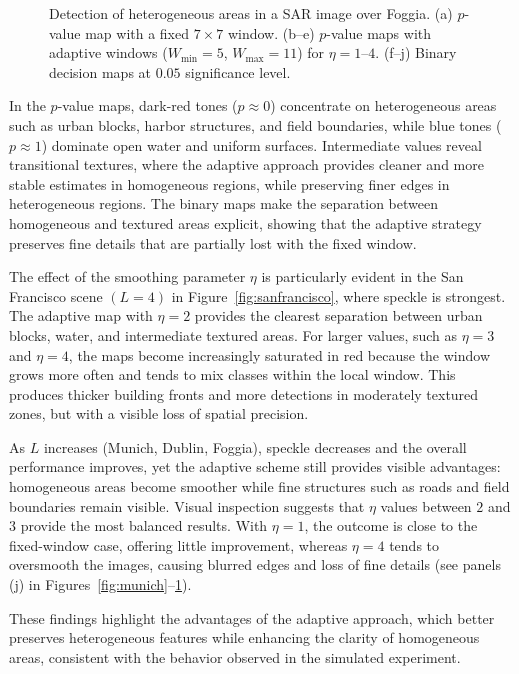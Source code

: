 \documentclass[
  lettersize  journal,
]{IEEEtran}%
\begin{document}
\begin{figure}[!t]
\caption{Detection of heterogeneous areas in a SAR image over Foggia. (a) $p$-value map with a fixed $7\times7$ window. (b–e) $p$-value maps with adaptive windows ($W_{\min}=5$, $W_{\max}=11$) for $\eta=1$--$4$. (f–j) Binary decision maps at $0.05$ significance level.}
\label{fig:foggia}
\end{figure}

In the \(p\)-value maps, dark-red tones (\(p \approx 0\)) concentrate on
heterogeneous areas such as urban blocks, harbor structures, and field
boundaries, while blue tones (\(p \approx 1\)) dominate open water and
uniform surfaces. Intermediate values reveal transitional textures,
where the adaptive approach provides cleaner and more stable estimates
in homogeneous regions, while preserving finer edges in heterogeneous
regions. The binary maps make the separation between homogeneous and
textured areas explicit, showing that the adaptive strategy preserves
fine details that are partially lost with the fixed window.

The effect of the smoothing parameter \(\eta\) is particularly evident
in the San Francisco scene \((L = 4)\) in Figure~\ref{fig:sanfrancisco},
where speckle is strongest. The adaptive map with \(\eta = 2\) provides
the clearest separation between urban blocks, water, and intermediate
textured areas. For larger values, such as \(\eta = 3\) and
\(\eta = 4\), the maps become increasingly saturated in red because the
window grows more often and tends to mix classes within the local
window. This produces thicker building fronts and more detections in
moderately textured zones, but with a visible loss of spatial precision.

As \(L\) increases (Munich, Dublin, Foggia), speckle decreases and the
overall performance improves, yet the adaptive scheme still provides
visible advantages: homogeneous areas become smoother while fine
structures such as roads and field boundaries remain visible. Visual
inspection suggests that \(\eta\) values between \(2\) and \(3\) provide
the most balanced results. With \(\eta = 1\), the outcome is close to
the fixed-window case, offering little improvement, whereas \(\eta = 4\)
tends to oversmooth the images, causing blurred edges and loss of fine
details (see panels (j) in Figures~\ref{fig:munich}--\ref{fig:foggia}).

These findings highlight the advantages of the adaptive approach, which
better preserves heterogeneous features while enhancing the clarity of
homogeneous areas, consistent with the behavior observed in the
simulated experiment.
\end{document}

